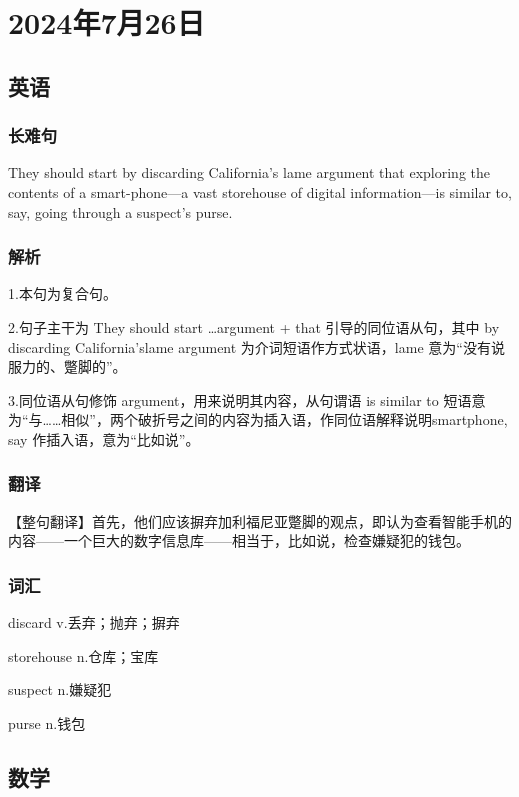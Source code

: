 \documentclass[UTF8]{ctexart}
\begin{document}
\section{2024年7月26日}
\subsection{英语}
\subsubsection{长难句}
They should start by discarding California's lame argument that exploring the contents of a smart-phone---a vast storehouse of digital information---is similar to, say, going through a suspect's purse.
\subsubsection{解析}
1.本句为复合句。

2.句子主干为 They should start …argument + that 引导的同位语从句，其中 by discarding California’slame argument 为介词短语作方式状语，lame 意为“没有说
服力的、蹩脚的”。

3.同位语从句修饰 argument，用来说明其内容，从句谓语 is similar to 短语意为“与……相似”，两个破折号之间的内容为插入语，作同位语解释说明smartphone, say 作插入语，意为“比如说”。
\subsubsection{翻译}
【整句翻译】首先，他们应该摒弃加利福尼亚蹩脚的观点，即认为查看智能手机的内容——一个巨大的数字信息库——相当于，比如说，检查嫌疑犯的钱包。
\subsubsection{词汇}
\begin{multicols}{2}
      discard v.丢弃；抛弃；摒弃

      storehouse n.仓库；宝库

      suspect n.嫌疑犯

      purse n.钱包
\end{multicols}
\subsection{数学}
\end{document}
